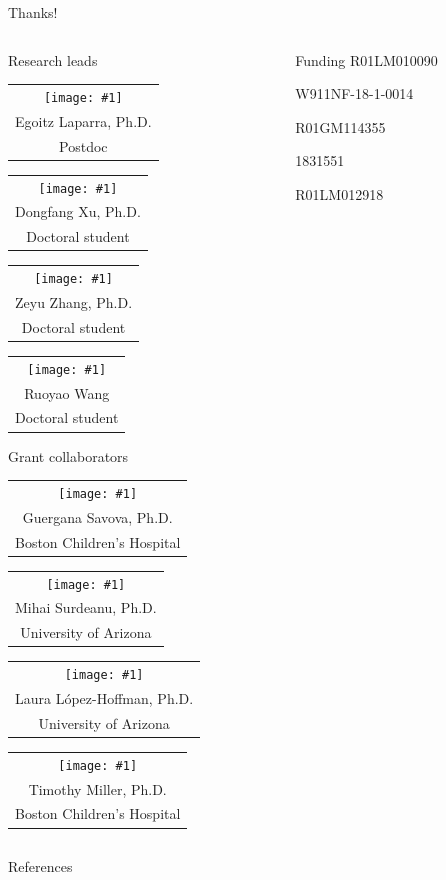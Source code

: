 \documentclass[14pt,aspectratio=169]{beamer}
\newcommand{\headshot}[3]{{\tiny\setlength{\tabcolsep}{0pt}%
\begin{tabular}{c}
\texttt{[image: \#1]} \\
#2 \\
#3
\end{tabular}}}
\newcommand{\raisegraphics}[3]{\raisebox{-#1\height}{\texttt{[image: \#3]}}}
\newcommand{\funding}[2]{\raisegraphics{.2}{height=.05\textheight}{#1} #2}
\begin{document}
\begin{frame}{Thanks!}
\begin{columns}
\begin{column}{0.65\textwidth}
\begin{block}{Research leads}
\headshot{people/laparra-egoitz.jpg}{Egoitz Laparra, Ph.D.}{Postdoc}
\quad
\headshot{people/xu-dongfang.jpeg}{Dongfang Xu, Ph.D.}{Doctoral student}
\quad
\headshot{people/zhang-zeyu.png}{Zeyu Zhang, Ph.D.}{Doctoral student}
\quad
\headshot{people/wang-ruoyao.png}{Ruoyao Wang}{Doctoral student}
\end{block}
\begin{block}{Grant collaborators}
\headshot{people/savova-guergana.jpg}{Guergana Savova, Ph.D.}{Boston Children's Hospital}
\headshot{people/surdeanu-mihai.jpeg}{Mihai Surdeanu, Ph.D.}{University of Arizona}
\headshot{people/lopez-hoffmann-laura.jpg}{Laura L\'{o}pez-Hoffman, Ph.D.}{University of Arizona}
\headshot{people/miller-timothy.jpg}{Timothy Miller, Ph.D.}{Boston Children's Hospital}
\end{block}
\end{column}
\hfill
\begin{column}{0.3\textwidth}
\begin{block}{Funding}
\small
\funding{funding/nih_nlm.png}{R01LM010090}

\funding{funding/darpa.png}{W911NF-18-1-0014}

\funding{funding/nih_nigms.jpg}{R01GM114355}

\funding{funding/nsf.png}{1831551}

\funding{funding/nih_nlm.png}{R01LM012918}
\end{block}
\end{column}
\end{columns}
\end{frame}


\appendix

\begin{frame}[allowframebreaks]{References}
\printbibliography
\end{frame}
\end{document}
